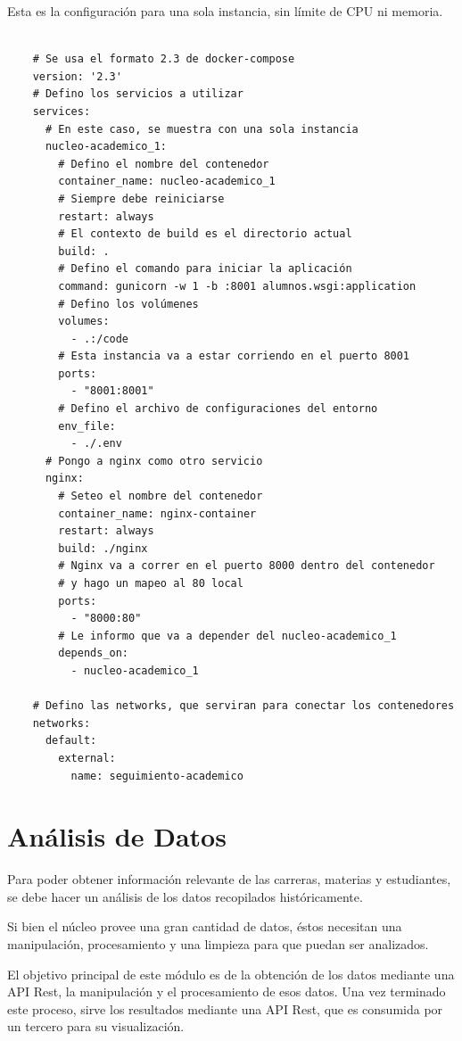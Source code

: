 Esta es la configuración para una sola instancia, sin límite de CPU ni memoria.


\begin{verbatim}
    
    # Se usa el formato 2.3 de docker-compose
    version: '2.3'
    # Defino los servicios a utilizar
    services:
      # En este caso, se muestra con una sola instancia
      nucleo-academico_1:
        # Defino el nombre del contenedor
        container_name: nucleo-academico_1
        # Siempre debe reiniciarse
        restart: always
        # El contexto de build es el directorio actual
        build: .
        # Defino el comando para iniciar la aplicación
        command: gunicorn -w 1 -b :8001 alumnos.wsgi:application
        # Defino los volúmenes
        volumes:
          - .:/code
        # Esta instancia va a estar corriendo en el puerto 8001
        ports:
          - "8001:8001"
        # Defino el archivo de configuraciones del entorno
        env_file:
          - ./.env
      # Pongo a nginx como otro servicio
      nginx:
        # Seteo el nombre del contenedor
        container_name: nginx-container
        restart: always
        build: ./nginx
        # Nginx va a correr en el puerto 8000 dentro del contenedor 
        # y hago un mapeo al 80 local
        ports:
          - "8000:80"
        # Le informo que va a depender del nucleo-academico_1
        depends_on:
          - nucleo-academico_1
    
    # Defino las networks, que serviran para conectar los contenedores
    networks:
      default:
        external:
          name: seguimiento-academico
  \end{verbatim}

\section[Análisis de Datos]{Análisis de Datos}

Para poder obtener información relevante de las carreras, materias y estudiantes, se debe hacer un análisis de los datos recopilados históricamente.

Si bien el núcleo provee una gran cantidad de datos, éstos necesitan una manipulación, procesamiento y una limpieza para que puedan ser analizados.

El objetivo principal de este módulo es de la obtención de los datos mediante una API Rest, la manipulación y el procesamiento de esos datos. Una vez terminado este proceso, sirve los resultados mediante una API Rest, que es consumida por un tercero para su visualización.


